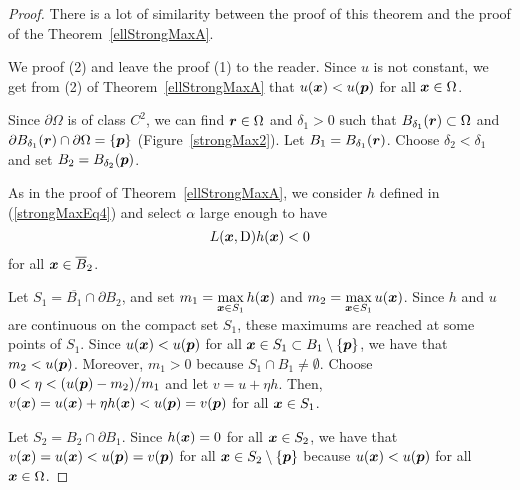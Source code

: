 \begin{proof}
There is a lot of similarity between the proof of this theorem and the
proof of the Theorem~\ref{ellStrongMaxA}.

We proof (2) and leave the proof (1) to the reader.  Since $u$ is not
constant, we get from (2) of Theorem~\ref{ellStrongMaxA}
that $u({\bm{x}}) < u({\bm{p}})$ for all ${\bm{x}} \in \Omega$.

Since $\partial \Omega$ is of class $\displaystyle C^2$, we can find
${\bm{r}} \in \Omega$ and $\delta_1>0$ such that
$B_{\delta_1}({\bm{r}}) \subset \Omega$ and
$\partial B_{\delta_1}({\bm{r}}) \cap \partial \Omega = \{ {\bm{p}} \}$
(Figure~\ref{strongMax2}).
Let $B_1 = B_{\delta_1}({\bm{r}})$.  Choose $\delta_2 < \delta_1$ and set
$B_2 = B_{\delta_2}({\bm{p}})$.

As in the proof of Theorem~\ref{ellStrongMaxA}, we consider $h$
defined in (\ref{strongMaxEq4}) and select $\alpha$ large enough to have
\begin{equation} \label{dirDerMaxAEq1}
L({\bm{x}},\operatorname{D}) h ({\bm{x}})  < 0
\end{equation}
for all ${\bm{x}} \in \overline{B}_2$.

Let $S_1 = \overline{B_1} \cap \partial B_2$, and set
$\displaystyle m_1 = \max_{{\bm{x}} \in S_1} h({\bm{x}})$
and $\displaystyle m_2 = \max_{{\bm{x}} \in S_1} u({\bm{x}})$.
Since $h$ and $u$ are continuous on the compact set $S_1$, these
maximums are reached at some points of $S_1$.  Since $u({\bm{x}}) < u({\bm{p}})$
for all ${\bm{x}} \in S_1 \subset B_1 \setminus \{{\bm{p}}\}$, we have
that $m_2 < u({\bm{p}})$.  Moreover, $m_1>0$ because
$S_1 \cap B_1 \neq \emptyset$.
Choose $0< \eta < (u({\bm{p}})- m_2)/m_1$ and let $v = u + \eta h$.
Then, $v({\bm{x}}) = u({\bm{x}}) + \eta h({\bm{x}}) < u({\bm{p}}) = v({\bm{p}})$
for all ${\bm{x}} \in S_1$.

Let $S_2 = B_2 \cap \partial B_1$.  Since $h({\bm{x}}) = 0$ for all
${\bm{x}} \in S_2$, we have that
$v({\bm{x}}) = u({\bm{x}}) < u({\bm{p}}) = v({\bm{p}})$
for all ${\bm{x}} \in S_2\setminus \{{\bm{p}}\}$ because
$u({\bm{x}}) < u({\bm{p}})$ for all ${\bm{x}} \in \Omega$.


\end{proof}
